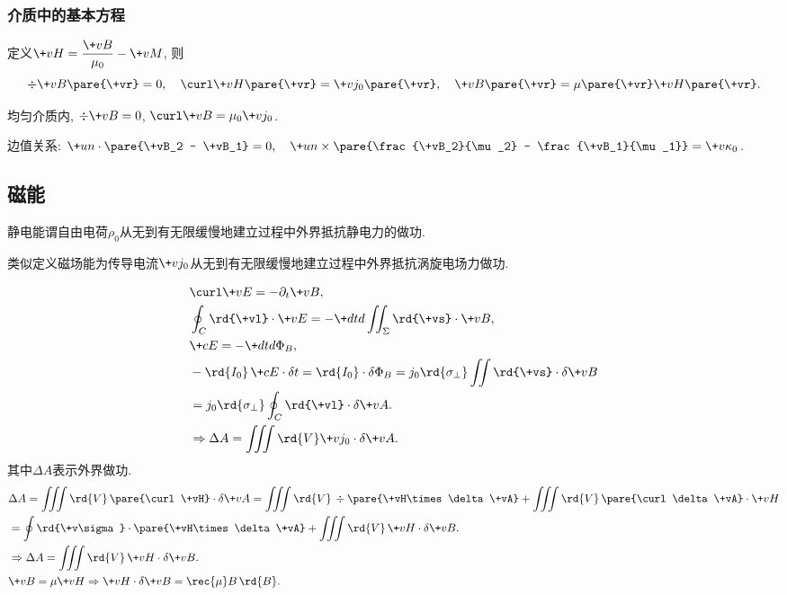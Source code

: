 \documentclass[hidelinks]{ctexart}
\begin{document}

\subsubsection{介质中的基本方程} %
\label{ssub:介质中的基本方程}

定义$\displaystyle \+vH = \frac{\+vB}{\mu_0} - \+vM$, 则
\[ \div \+vB\pare{\+vr} = 0,\quad \curl \+vH\pare{\+vr} = \+vj_0\pare{\+vr},\quad \+vB\pare{\+vr} = \mu\pare{\+vr}\+vH\pare{\+vr}. \]
\begin{cenum}
    \item 均匀介质内, $\div \+vB = 0$, $\curl \+vB = \mu_0 \+vj_0$.
    \item 边值关系: $\+un\cdot \pare{\+vB_2 - \+vB_1} = 0,\quad \+un\times \pare{\frac{\+vB_2}{\mu_2} - \frac{\+vB_1}{\mu_1}} = \+v\kappa_0$.
\end{cenum}



\subsection{磁能} %
\label{sub:磁能}

静电能谓自由电荷$\rho_0$从无到有无限缓慢地建立过程中外界抵抗静电力的做功.
\par
类似定义磁场能为传导电流$\+vj_0$从无到有无限缓慢地建立过程中外界抵抗涡旋电场力做功.
\begin{figure}[ht]
    \centering
\end{figure}
\begin{align*}
    & \curl \+vE = -\partial_t \+vB, \\
    & \oint_C \rd{\+vl}\cdot \+vE = -\+dtd{}\iint_\Sigma \rd{\+vs}\cdot \+vB, \\
    & \+cE = -\+dtd{\Phi_B}, \\
    & -\rd{I_0}\,\+cE\cdot \delta t = \rd{I_0}\cdot \delta \Phi_B = j_0 \rd{\sigma_\perp}\iint \rd{\+vs}\cdot \delta \+vB \\
    &= j_0 \rd{\sigma_\perp}\oint_C \rd{\+vl}\cdot \delta \+vA. \\
    & \Rightarrow \Delta A = \iiint \rd{V} \+vj_0\cdot \delta \+vA.
\end{align*}
其中$\Delta A$表示外界做功.
\begin{align*}
    & \Delta A = \iiint \rd{V}\, \pare{\curl \+vH}\cdot \delta \+vA = \iiint \rd{V}\, \div \pare{\+vH\times \delta \+vA} + \iiint\rd{V}\,\pare{\curl \delta \+vA}\cdot \+vH \\
    &= \oint \rd{\+v\sigma}\cdot \pare{\+vH\times \delta \+vA} + \iiint \rd{V}\, \+vH\cdot \delta \+vB. \\
    & \Rightarrow \Delta A = \iiint \rd{V}\,\+vH\cdot \delta \+vB. \\
    & \+vB = \mu \+vH \Rightarrow \+vH\cdot \delta \+vB = \rec{\mu}B\,\rd{B}.
\end{align*}
\end{document}
